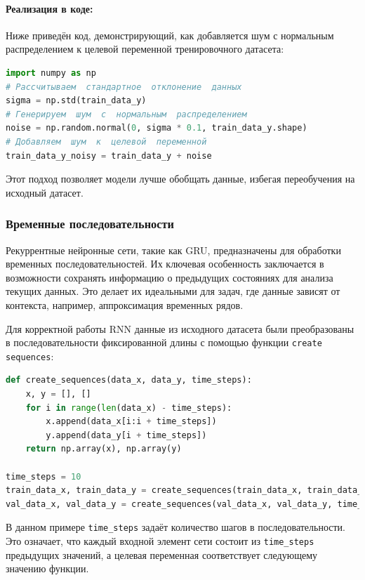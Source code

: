 \paragraph{Реализация в коде:}
Ниже приведён код, демонстрирующий, как добавляется шум с нормальным распределением к целевой переменной тренировочного датасета:

\begin{lstlisting}[language=Python, breaklines, caption=Добавление шума с нормальным распределением]
import numpy as np
# Рассчитываем  стандартное  отклонение  данных
sigma = np.std(train_data_y)
# Генерируем  шум  с  нормальным  распределением
noise = np.random.normal(0, sigma * 0.1, train_data_y.shape)
# Добавляем  шум  к  целевой  переменной
train_data_y_noisy = train_data_y + noise
\end{lstlisting}
Этот подход позволяет модели лучше обобщать данные, избегая переобучения на исходный датасет.

\subsubsection{Временные последовательности}
Рекуррентные нейронные сети, такие как GRU, предназначены для обработки временных последовательностей. Их ключевая особенность заключается в возможности сохранять информацию о предыдущих состояниях для анализа текущих данных. Это делает их идеальными для задач, где данные зависят от контекста, например, аппроксимация временных рядов.

Для корректной работы RNN данные из исходного датасета были преобразованы в последовательности фиксированной длины с помощью функции \texttt{create sequences}:

\begin{lstlisting}[language=Python, breaklines, caption=Создание временных последовательностей]
def create_sequences(data_x, data_y, time_steps):
    x, y = [], []
    for i in range(len(data_x) - time_steps):
        x.append(data_x[i:i + time_steps])
        y.append(data_y[i + time_steps])
    return np.array(x), np.array(y)

time_steps = 10
train_data_x, train_data_y = create_sequences(train_data_x, train_data_y, time_steps)
val_data_x, val_data_y = create_sequences(val_data_x, val_data_y, time_steps)
\end{lstlisting}

В данном примере \texttt{time\_steps} задаёт количество шагов в последовательности. Это означает, что каждый входной элемент сети состоит из \texttt{time\_steps} предыдущих значений, а целевая переменная соответствует следующему значению функции.

